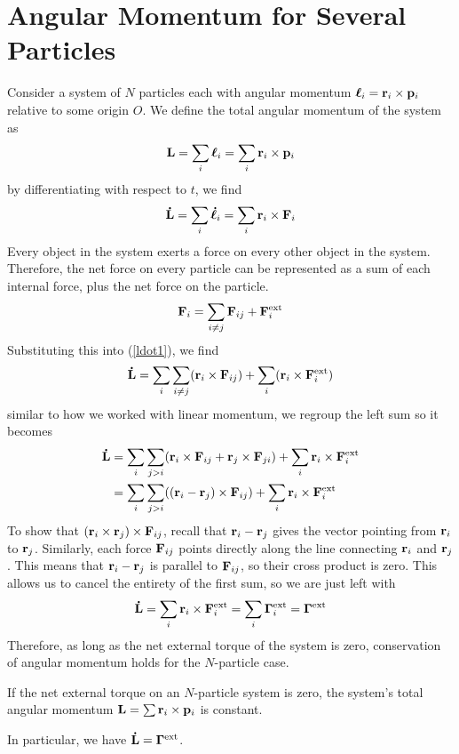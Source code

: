 \section{Angular Momentum for Several Particles}
Consider a system of $N$ particles each with angular momentum $\bm{\ell}_i = \mathbf{r}_i \times \mathbf{p}_i$ relative to some origin $O$. We define the total angular momentum of the system as
\[ \mathbf{L} = \sum_i \bm{\ell}_i = \sum_i \mathbf{r}_i \times \mathbf{p}_i \]
by differentiating with respect to $t$, we find
\begin{equation} \label{ldot1}
    \mathbf{\dot L} = \sum_i \bm{\dot \ell}_i = \sum_i \mathbf{r}_i \times \mathbf{F}_i
\end{equation}
Every object in the system exerts a force on every other object in the system. Therefore, the net force on every particle can be represented as a sum of each internal force, plus the net force on the particle. 
\[ \mathbf{F}_i = \sum _{i\neq j} \mathbf{F}_{ij} + \mathbf{F}^\text{ext}_i \]
Substituting this into (\ref{ldot1}), we find
\[ \mathbf{\dot L} = \sum_{i}\sum_{i\neq j} (\mathbf{r}_i \times \mathbf{F}_{ij}) + \sum_i(\mathbf{r}_i \times \mathbf{F}^\text{ext}_i) \]
similar to how we worked with linear momentum, we regroup the left sum so it becomes
\begin{align*}
    \mathbf{\dot L} &= \sum_i \sum_{j > i}(\mathbf{r}_i \times \mathbf{F}_{ij} + \mathbf{r}_j \times \mathbf{F}_{ji}) + \sum_i \mathbf{r}_i\times \mathbf{F}^\text{ext}_i \\
    &= \sum_i \sum_{j > i}((\mathbf{r}_i - \mathbf{r}_j)\times \mathbf{F}_{ij}) + \sum_i \mathbf{r}_i\times \mathbf{F}^\text{ext}_i
\end{align*}
To show that $(\mathbf{r}_i \times \mathbf{r}_j)\times\mathbf{F}_{ij}$, recall that $\mathbf{r}_i - \mathbf{r}_j$ gives the vector pointing from $\mathbf{r}_i$ to $\mathbf{r}_j$. Similarly, each force $\mathbf{F}_{ij}$ points directly along the line connecting $\mathbf{r}_i$ and $\mathbf{r}_j$. This means that $\mathbf{r}_i - \mathbf{r}_j$ is parallel to $\mathbf{F}_{ij}$, so their cross product is zero. This allows us to cancel the entirety of the first sum, so we are just left with
\[ \mathbf{\dot L} = \sum_i \mathbf{r}_i \times \mathbf{F}^\text{ext}_i = \sum_i \bm{\Gamma}_i^\text{ext} = \bm{\Gamma}^\text{ext} \]
Therefore, as long as the net external torque of the system is zero, conservation of angular momentum holds for the $N$-particle case.
\begin{theorem}
    If the net external torque on an $N$-particle system is zero, the system's total angular momentum $\mathbf{L} = \sum \mathbf{r}_i \times \mathbf{p}_i$ is constant.

    In particular, we have $\mathbf{\dot L} = \bm{\Gamma}^\text{ext}$.
\end{theorem}
